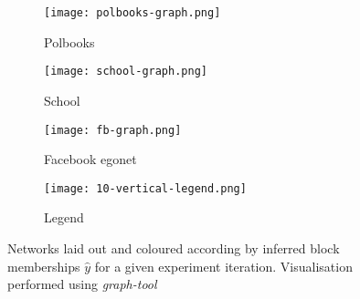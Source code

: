 \begin{figure}[!h]
	\centering
	\begin{subfigure}[t]{0.28\linewidth}
		\centering
		\texttt{[image: polbooks-graph.png]}
		\caption{Polbooks}
		\label{fig:polbooks-graph}
	\end{subfigure}
	\hfill
	\begin{subfigure}[t]{0.28\linewidth}
		\centering
		\texttt{[image: school-graph.png]}
		\caption{School}
		\label{fig:school-graph}
	\end{subfigure}
	\hfill
	\begin{subfigure}[t]{0.28\linewidth}
		\centering
		\texttt{[image: fb-graph.png]}
		\caption{Facebook egonet}
		\label{fig:fb-graph}
	\end{subfigure}
	\begin{subfigure}[t]{0.10\linewidth}
		\centering
		\texttt{[image: 10-vertical-legend.png]}
		\caption{Legend}
		\label{fig:10-legend}
	\end{subfigure}
	\caption{Networks laid out and coloured according by inferred block memberships $\hat{y}$ for a given experiment iteration. Visualisation performed using \textit{graph-tool} \cite{peixoto_graph-tool_2014}}
	\label{fig:graphs-all}
\end{figure}

